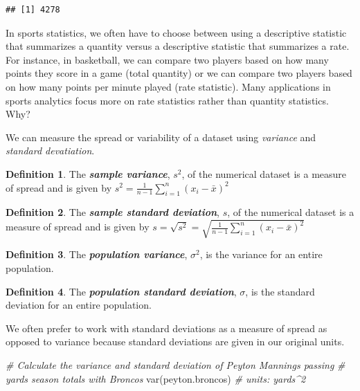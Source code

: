 \documentclass[
  11pt,
]{book}
\newenvironment{Shaded}{\begin{snugshade}}{\end{snugshade}}
\newcommand{\CommentTok}[1]{\textcolor[rgb]{0.56,0.35,0.01}{\textit{#1}}}
\newcommand{\FunctionTok}[1]{\textcolor[rgb]{0.00,0.00,0.00}{#1}}
\newcommand{\NormalTok}[1]{#1}
\theoremstyle{definition}
\newtheorem{definition}{Definition}[chapter]
\theoremstyle{definition}
\theoremstyle{definition}
\theoremstyle{definition}
\theoremstyle{remark}
\begin{document}
\begin{verbatim}
## [1] 4278
\end{verbatim}

In sports statistics, we often have to choose between using a descriptive statistic that summarizes a quantity versus a descriptive statistic that summarizes a rate. For instance, in basketball, we can compare two players based on how many points they score in a game (total quantity) or we can compare two players based on how many points per minute played (rate statistic). Many applications in sports analytics focus more on rate statistics rather than quantity statistics. Why?

We can measure the spread or variability of a dataset using \emph{variance} and \emph{standard devatiation}.

\begin{definition}
The \textbf{\emph{sample variance}}, \(s^2\), of the numerical dataset is a measure of spread and is given by \(s^2 = \frac{1}{n-1}\sum_{i=1}^n (x_i - \bar{x})^2\)
\end{definition}

\begin{definition}
The \textbf{\emph{sample standard deviation}}, \(s\), of the numerical dataset is a measure of spread and is given by \(s = \sqrt{s^2} = \sqrt{\frac{1}{n-1}\sum_{i=1}^n (x_i - \bar{x})^2}\)
\end{definition}

\begin{definition}
The \textbf{\emph{population variance}}, \(\sigma^2\), is the variance for an entire population.
\end{definition}

\begin{definition}
The \textbf{\emph{population standard deviation}}, \(\sigma\), is the standard deviation for an entire population.
\end{definition}

We often prefer to work with standard deviations as a measure of spread as opposed to variance because standard deviations are given in our original units.

\begin{Shaded}
\begin{Highlighting}[]
\CommentTok{\# Calculate the variance and standard deviation of Peyton Manning\textquotesingle{}s passing}
\CommentTok{\# yards season totals with Broncos}
\FunctionTok{var}\NormalTok{(peyton.broncos)  }\CommentTok{\# units: yards\^{}2}
\end{Highlighting}
\end{Shaded}
\end{document}
